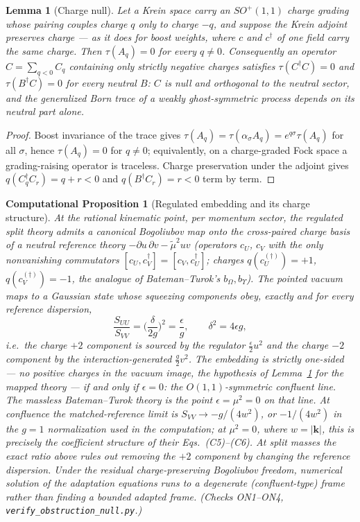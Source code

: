 \documentclass[11pt]{article}
\newtheorem{lemma}[theorem]{Lemma}
\newtheorem{cproposition}[theorem]{Computational Proposition}
\theoremstyle{definition}
\theoremstyle{remark}
\newcommand{\dg}{\dagger}
\begin{document}
\begin{lemma}[Charge null]\label{lem:chargenull}
Let a Krein space carry an $SO^+(1,1)$ charge grading whose pairing
couples charge $q$ only to charge $-q$, and suppose the Krein adjoint
preserves charge --- as it does for boost weights, where $c$ and
$c^{\dg}$ of one field carry the \emph{same} charge.  Then
$\tau(A_q)=0$ for every $q\neq0$.  Consequently an operator
$C=\sum_{q<0}C_q$ containing only strictly negative charges satisfies
$\tau(C^{\dg}C)=0$ and $\tau(B^{\dg}C)=0$ for every neutral $B$: $C$
is null and orthogonal to the neutral sector, and the generalized Born
trace of a weakly ghost-symmetric process depends on its neutral part
alone.
\end{lemma}

\begin{proof}
Boost invariance of the trace gives
$\tau(A_q)=\tau(\alpha_\sigma A_q)=e^{q\sigma}\tau(A_q)$ for all
$\sigma$, hence $\tau(A_q)=0$ for $q\neq0$; equivalently, on a
charge-graded Fock space a grading-raising operator is traceless.
Charge preservation under the adjoint gives
$q(C_{q}^{\dg}C_{r})=q+r<0$ and $q(B^{\dg}C_{r})=r<0$ term by term.
\end{proof}

\begin{cproposition}[Regulated embedding and its charge structure]
\label{cprop:embedding}
At the rational kinematic point, per momentum sector, the regulated
split theory admits a canonical Bogoliubov map onto the cross-paired
charge basis of a neutral reference theory
$-\partial u\,\partial v-\tilde\mu^2uv$ (operators $c_U$, $c_V$ with
the only nonvanishing commutators $[c_U,c_V^{\dg}]=[c_V,c_U^{\dg}]$;
charges $q(c_U^{(\dg)})=+1$, $q(c_V^{(\dg)})=-1$, the analogue of
Bateman--Turok's $b_\Omega,b_\Upsilon$).  The pointed vacuum maps to a
Gaussian state whose squeezing components obey, exactly and for every
reference dispersion,
\begin{equation}
\frac{S_{UU}}{S_{VV}}=\Big(\frac{\delta}{2g}\Big)^{2}
=\frac{\epsilon}{g},
\qquad \delta^2=4\epsilon g,
\end{equation}
i.e.\ the charge $+2$ component is sourced by the regulator
$\tfrac\epsilon2u^2$ and the charge $-2$ component by the
interaction-generated $\tfrac g2v^2$.  The embedding is strictly
one-sided --- no positive charges in the vacuum image, the hypothesis
of Lemma~\ref{lem:chargenull} for the mapped theory --- if and only if
$\epsilon=0$: the $O(1,1)$-symmetric confluent line.  The massless
Bateman--Turok theory is the point $\epsilon=\mu^2=0$ on that line.
At confluence the matched-reference limit is
$S_{VV}\to-g/(4w^2)$, or $-1/(4w^2)$ in the $g=1$ normalization used
in the computation; at $\mu^2=0$, where $w=|\mathbf k|$, this is
precisely the coefficient structure of their Eqs.~(C5)--(C6).  At
split masses the exact ratio above rules out removing the $+2$
component by changing the reference dispersion.  Under the residual
charge-preserving Bogoliubov freedom, numerical solution of the
adaptation equations runs to a degenerate (confluent-type) frame rather
than finding a bounded adapted frame.  (Checks ON1--ON4,
\texttt{verify\_obstruction\_null.py}.)
\end{cproposition}
\end{document}
